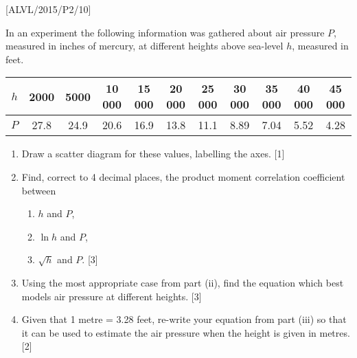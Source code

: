 \item {[}ALVL/2015/P2/10{]}

In an experiment the following information was gathered about air
pressure $P$, measured in inches of mercury, at different heights
above sea-level $h$, measured in feet. 
\noindent \begin{center}
\begin{tabular}{|c|c|c|c|c|c|c|c|c|c|c|}
\hline 
$h$ & 2000 & 5000 & 10 000 & 15 000 & 20 000 & 25 000 & 30 000 & 35 000 & 40 000 & 45 000\tabularnewline
\hline 
$P$ & 27.8 & 24.9 & 20.6 & 16.9 & 13.8 & 11.1 & 8.89 & 7.04 & 5.52 & 4.28\tabularnewline
\hline 
\end{tabular} 
\par\end{center}
\begin{enumerate}
\item Draw a scatter diagram for these values, labelling the axes. \hfill{}
{[}1{]}
\item Find, correct to 4 decimal places, the product moment correlation
coefficient between 
\begin{enumerate}
\item $h$ and $P$, 
\item $\ln h$ and $P$, 
\item $\sqrt{h}$ and $P$. \hfill{}{[}3{]}
\end{enumerate}
\item Using the most appropriate case from part (ii), find the equation
which best models air pressure at different heights. \hfill{}{[}3{]}
\item Given that 1 metre = 3.28 feet, re-write your equation from part (iii)
so that it can be used to estimate the air pressure when the height
is given in metres. \hfill{} {[}2{]}
\end{enumerate}
